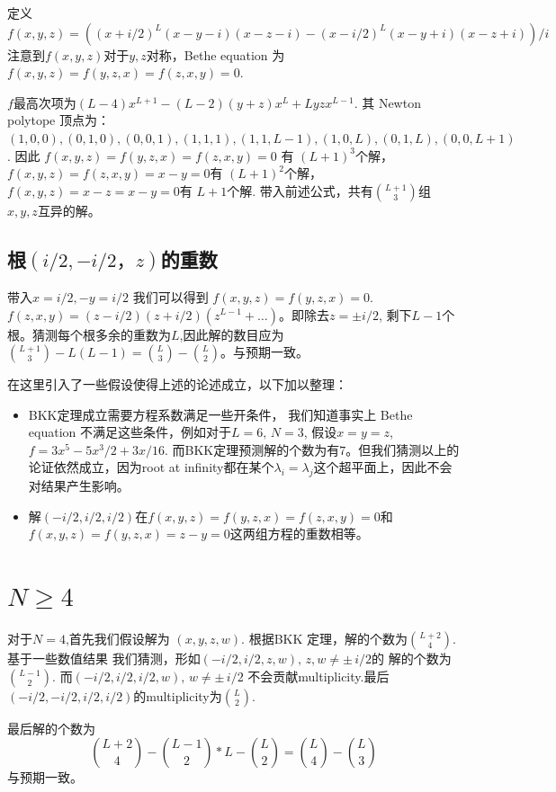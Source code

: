 定义
\[
    f(x,y,z)=((x+i/2)^L(x-y-i)(x-z-i)-(x-i/2)^L(x-y+i)(x-z+i))/i
\]
注意到$f(x,y,z)$对于$y,z$对称，Bethe equation 为 $f(x,y,z)=f(y,z,x)=f(z,x,y)=0$. 

$f$最高次项为$(L-4)x^{L+1}-(L-2)(y+z)x^L+Lyzx^{L-1}$.
其 Newton polytope 顶点为：$(1,0,0),
                (0,1,0),
                (0,0,1),
                (1,1,1),
                (1,1,L-1),
                (1,0,L),
                (0,1,L),
                (0,0,L+1)$. 
因此 $f(x,y,z)=f(y,z,x)=f(z,x,y)=0$ 有 $(L+1)^3$个解，$f(x,y,z)=f(z,x,y)=x-y=0$有 $(L+1)^2$个解， $f(x,y,z)=x-z=x-y=0$有 $L+1$个解.
带入前述公式，共有$\binom{L+1}{3}$组$x,y,z$互异的解。

\subsection{根$(i/2,-i/2，z)$的重数}
带入$x=i/2,-y=i/2$ 我们可以得到 $f(x,y,z)=f(y,z,x)=0$.
$f(z,x,y)=(z-i/2)(z+i/2)(z^{L-1}+\dots)$。即除去$z=\pm i/2$,
剩下$L-1$个根。猜测每个根多余的重数为$L$,因此解的数目应为 $\binom{L+1}{3}-L(L-1)=\binom{L}{3}-\binom{L}{2}$。与预期一致。

\begin{remark}
    在这里引入了一些假设使得上述的论述成立，以下加以整理：
    \begin{itemize}
        \item BKK定理成立需要方程系数满足一些开条件，
        我们知道事实上 Bethe equation 不满足这些条件，例如对于$L=6,\,N=3$, 假设$x=y=z$, $f=3x^5-5x^3/2+3x/16$.
        而BKK定理预测解的个数为有$7$。但我们猜测以上的论证依然成立，因为root at infinity都在某个$\lambda_i=\lambda_j$这个超平面上，因此不会对结果产生影响。
        \item 解$(-i/2,i/2,i/2)$在$f(x,y,z)=f(y,z,x)=f(z,x,y)=0$和$f(x,y,z)=f(y,z,x)=z-y=0$这两组方程的重数相等。
    \end{itemize}
\end{remark}

\section{$N\ge 4$}
对于$N=4$,首先我们假设解为 $(x,y,z,w)$. 根据BKK
定理，解的个数为$\binom{L+2}{4}$. 基于一些数值结果
我们猜测，形如$(-i/2,i/2,z,w),\,z,w\not=\pm\, i/2$的
解的个数为$\binom{L-1}{2}$. 而$(-i/2,i/2,i/2,w),\,w\not=\pm\, i/2$
不会贡献multiplicity.最后$(-i/2,-i/2,i/2,i/2)$的multiplicity为$\binom{L}{2}$.

最后解的个数为
\[\binom{L+2}{4}-\binom{L-1}{2}*L-\binom{L}{2}=\binom{L}{4}-\binom{L}{3}\]
与预期一致。


